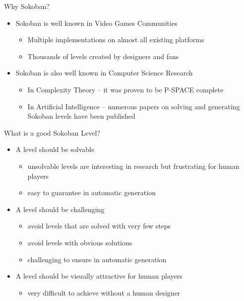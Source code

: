 \documentclass[12pt, aspectratio=169]{beamer} %
\begin{document}
\begin{frame}{Why Sokoban?}
  \begin{itemize}
    \item Sokoban is well known in Video Games Communities
    \begin{itemize}
    	\item Multiple implementations on almost all existing platforms
    	\item Thousands of levels created by designers and fans
    \end{itemize}
    \item Sokoban is also well known in Computer Science Research
    \begin{itemize}
    	\item In Complexity Theory -- it was proven to be P-SPACE complete
    	\item In Artificial Intelligence -- numerous papers on solving and generating Sokoban levels have been published
    \end{itemize}
  \end{itemize}
\end{frame}

\begin{frame}{What is a good Sokoban Level?}
  \begin{itemize}
    \item A level should be solvable
    \begin{itemize}
    	\item unsolvable levels are interesting in research but frustrating for human players
    	\item easy to guarantee in automatic generation
    \end{itemize}
    \item A level should be challenging
    \begin{itemize}
    	\item avoid levels that are solved with very few steps
    	\item avoid levels with obvious solutions
    	\item challenging to ensure in automatic generation
    \end{itemize}
    \item A level should be visually attractive for human players
    \begin{itemize}
    	\item very difficult to achieve without a human designer
    \end{itemize}
    
  \end{itemize}
\end{frame}
\end{document}

